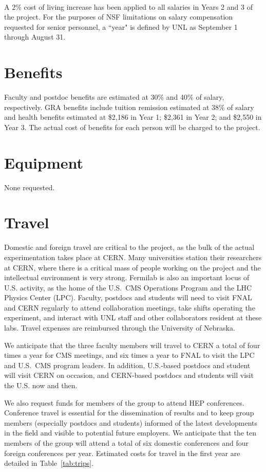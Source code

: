 \documentclass[11pt]{article}
\begin{document}
\paragraph{}
\noindent A 2\% cost of living increase has been applied to all salaries in Years 2
and 3 of the project.  For the purposes of NSF limitations on salary compensation requested for senior personnel, a ``year" is defined by UNL as September 1 through August 31.

\section{Benefits}
Faculty and postdoc benefits are estimated at 30\% and 40\% of salary,
respectively.  GRA benefits include tuition remission estimated at 38\% of
salary and health benefits estimated at \$2,186 in Year 1; \$2,361 in Year
2; and \$2,550 in Year 3. The actual cost of benefits for each person will
be charged to the project.

\section{Equipment} 
None requested.

\section{Travel}
Domestic and foreign travel are critical to the project, as the bulk of the
actual experimentation takes place at CERN. Many universities station their researchers at CERN, where there is a critical mass of people working on the project and the intellectual environment is very strong. Fermilab is also an important locus of U.S. activity, as the home of the U.S.~CMS Operations Program and the LHC Physics Center (LPC).  Faculty, postdocs and students will need to visit FNAL and CERN regularly to attend collaboration meetings, take shifts operating the experiment, and interact with UNL staff and other collaborators resident at these labs.  Travel expenses are reimbursed through the University of Nebraska.

We anticipate that the three faculty members will travel to CERN a
total of four times a year for CMS meetings, and six times a
year to FNAL to visit the LPC and U.S.~CMS program leaders.  In addition,
U.S.-based postdocs and student will visit CERN on occasion, and CERN-based
postdocs and students will visit the U.S. now and then.

We also request funds for members of the group to attend HEP conferences.
Conference travel is essential for the dissemination of results and to keep
group members (especially postdocs and students) informed of the latest
developments in the field and visible to potential future employers.  We
anticipate that the ten members of the group will attend a total of
six domestic conferences and four foreign conferences per year.  Estimated
costs for travel in the first year are detailed in Table~\ref{tab:trips}.
\end{document}
